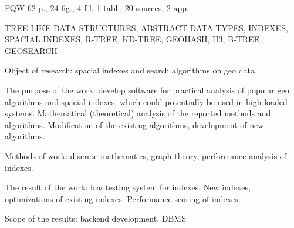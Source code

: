 \ReferatEN

FQW 62 p., 24 fig., 4 f-l, 1 tabl., 20 sources, 2 app.

\noindent TREE-LIKE DATA STRUCTURES, ABSTRACT DATA TYPES, INDEXES, SPACIAL INDEXES, R-TREE, KD-TREE, GEOHASH, H3, B-TREE, GEOSEARCH


Object of research: spacial indexes and search algorithms on geo data.

The purpose of the work: develop software for practical analysis of popular geo algorithms and spacial indexes, which could potentially be used in high loaded systems. Mathematical (theoretical) analysis of the reported methods and algorithms. Modification of the existing algorithms, development of new algorithms. 

Methods of work: discrete mathematics, graph theory, performance analysis of indexes.

The result of the work: loadtesting system for indexes. New indexes, optimizations of existing indexes. Performance scoring of indexes.

Scope of the results: backend development, DBMS



